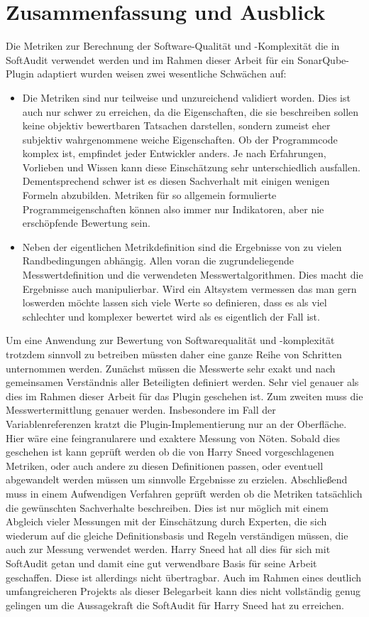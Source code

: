 \documentclass[gb,ngerman]{stthesis}
\begin{document}
 	\chapter{Zusammenfassung und Ausblick}
		Die Metriken zur Berechnung der Software-Qualität und -Komplexität die in SoftAudit verwendet werden und im Rahmen dieser Arbeit für ein SonarQube-Plugin adaptiert wurden weisen zwei wesentliche Schwächen auf:
		\begin{itemize}
			\item Die Metriken sind nur teilweise und unzureichend validiert worden. Dies ist auch nur schwer zu erreichen, da die Eigenschaften, die sie beschreiben sollen keine objektiv bewertbaren Tatsachen darstellen, sondern zumeist eher subjektiv wahrgenommene weiche Eigenschaften. Ob der Programmcode komplex ist, empfindet jeder Entwickler anders. Je nach Erfahrungen, Vorlieben und Wissen kann diese Einschätzung sehr unterschiedlich ausfallen. Dementsprechend schwer ist es diesen Sachverhalt mit einigen wenigen Formeln abzubilden. Metriken für so allgemein formulierte Programmeigenschaften können also immer nur Indikatoren, aber nie erschöpfende Bewertung sein.
			\item Neben der eigentlichen Metrikdefinition sind die Ergebnisse von zu vielen Randbedingungen abhängig. Allen voran die zugrundeliegende Messwertdefinition und die verwendeten Messwertalgorithmen. Dies macht die Ergebnisse auch manipulierbar. Wird ein Altsystem vermessen das man gern loswerden möchte lassen sich viele Werte so definieren, dass es als viel schlechter und komplexer bewertet wird als es eigentlich der Fall ist.
		\end{itemize}
		Um eine Anwendung zur Bewertung von Softwarequalität und -komplexität trotzdem sinnvoll zu betreiben müssten daher eine ganze Reihe von Schritten unternommen werden. Zunächst müssen die Messwerte sehr exakt und nach gemeinsamen Verständnis aller Beteiligten definiert werden. Sehr viel genauer als dies im Rahmen dieser Arbeit für das Plugin geschehen ist. Zum zweiten muss die Messwertermittlung genauer werden. Insbesondere im Fall der Variablenreferenzen kratzt die Plugin-Implementierung nur an der Oberfläche. Hier wäre eine feingranularere und exaktere Messung von Nöten. Sobald dies geschehen ist kann geprüft werden ob die von Harry Sneed vorgeschlagenen Metriken, oder auch andere zu diesen Definitionen passen, oder eventuell abgewandelt werden müssen um sinnvolle Ergebnisse zu erzielen. Abschließend muss in einem Aufwendigen Verfahren geprüft werden ob die Metriken tatsächlich die gewünschten Sachverhalte beschreiben. Dies ist nur möglich mit einem Abgleich vieler Messungen mit der Einschätzung durch Experten, die sich wiederum auf die gleiche Definitionsbasis und Regeln verständigen müssen, die auch zur Messung verwendet werden.	\newline Harry Sneed hat all dies für sich mit SoftAudit getan und damit eine gut verwendbare Basis für seine Arbeit geschaffen. Diese ist allerdings nicht übertragbar. Auch im Rahmen eines deutlich umfangreicheren Projekts als dieser Belegarbeit kann dies nicht vollständig genug gelingen um die Aussagekraft die SoftAudit für Harry Sneed hat zu erreichen. \newline
\end{document}
